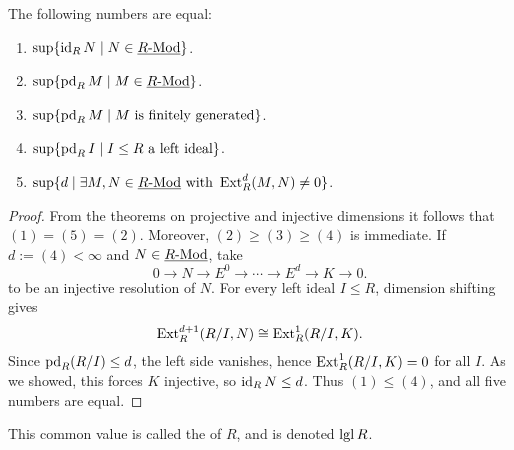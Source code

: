 \begin{theorem*}
	The following numbers are equal:
	\begin{enumerate}
		\item \( \displaystyle \sup\{\operatorname{id}_R N \mid N \in \underline{R\text{-}\mathrm{Mod}}\} \).
		\item \( \displaystyle \sup\{\operatorname{pd}_R M \mid M \in \underline{R\text{-}\mathrm{Mod}}\} \).
		\item \( \displaystyle \sup\{\operatorname{pd}_R M \mid M \text{ is finitely generated}\} \).
		\item \( \displaystyle \sup\{\operatorname{pd}_R I \mid I \le R\ \text{a left ideal}\} \).
		\item \( \displaystyle \sup\{ d \mid \exists M,N\in \underline{R\text{-}\mathrm{Mod}}\ \text{with}\ \operatorname{Ext}_R^{d}(M,N)\ne 0\} \).
	\end{enumerate}
\end{theorem*}
\begin{proof}
	From the theorems on projective and injective dimensions it follows that
	\( (1) = (5) = (2) \). Moreover, \( (2) \ge (3) \ge (4) \) is immediate. If \( d:=(4)<\infty \) and \( N\in \underline{R\text{-}\mathrm{Mod}} \), take
	\[
		0 \to N \to E^0 \to \dotsm \to E^d \to K \to 0.
	\]
	to be an injective resolution of \( N \). For every left ideal \( I\le R \), dimension shifting gives
	\[
		\operatorname{Ext}_R^{d+1}(R/I,N)\cong \operatorname{Ext}_R^{1}(R/I,K).
	\]
	Since \( \operatorname{pd}_R(R/I)\le d \), the left side vanishes, hence \( \operatorname{Ext}_R^{1}(R/I,K)=0 \) for all \( I \). As we showed, this forces \( K \) injective, so \( \operatorname{id}_R N\le d \). Thus \( (1) \le (4) \), and all five numbers are equal.
\end{proof}

\begin{definition*}
	This common value is called the  of \( R \), and is denoted \( \operatorname{lgl} R \).
\end{definition*}